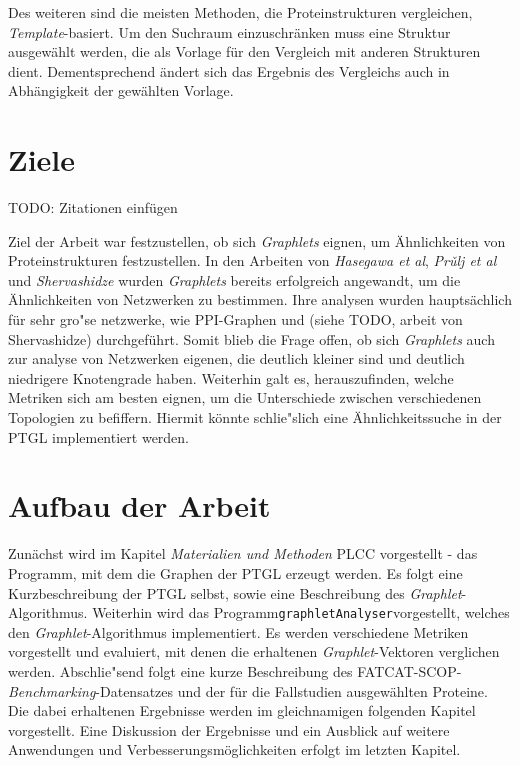 \documentclass{report}
\begin{document}
Des weiteren sind die meisten Methoden, die Proteinstrukturen vergleichen, \textit{Template}-basiert. Um den Suchraum einzuschr\"anken muss eine Struktur ausgew\"ahlt werden, die als Vorlage f\"ur den Vergleich mit anderen Strukturen dient. Dementsprechend \"andert sich das Ergebnis des Vergleichs auch in Abh\"angigkeit der gew\"ahlten Vorlage.



\section{Ziele}

TODO: Zitationen einf\"ugen

Ziel der Arbeit war festzustellen, ob sich \textit{Graphlets} eignen, um \"Ahnlichkeiten von Proteinstrukturen festzustellen. In den Arbeiten von \emph{Hasegawa et al}, \emph{Pr\v{u}lj et al} und \emph{Shervashidze} wurden \textit{Graphlets} bereits erfolgreich angewandt, um die \"Ahnlichkeiten von Netzwerken zu bestimmen. Ihre analysen wurden haupts\"achlich f\"ur sehr gro"se netzwerke, wie PPI-Graphen und (siehe TODO, arbeit von Shervashidze) durchgef\"uhrt. Somit blieb die Frage offen, ob sich \textit{Graphlets} auch zur analyse von Netzwerken eigenen, die deutlich kleiner sind und deutlich niedrigere Knotengrade haben.
Weiterhin galt es, herauszufinden, welche Metriken sich am besten eignen, um die Unterschiede zwischen verschiedenen Topologien zu befiffern.
Hiermit k\"onnte schlie"slich eine \"Ahnlichkeitssuche in der PTGL implementiert werden.

\section{Aufbau der Arbeit}

Zun\"achst wird im Kapitel \emph{Materialien und Methoden} PLCC vorgestellt - das Programm, mit dem die Graphen der PTGL erzeugt werden. Es folgt eine Kurzbeschreibung der PTGL selbst, sowie eine Beschreibung des \textit{Graphlet}-Algorithmus. Weiterhin wird das Programm\texttt{graphletAnalyser}vorgestellt, welches den \textit{Graphlet}-Algorithmus implementiert. Es werden verschiedene Metriken vorgestellt und evaluiert, mit denen die erhaltenen \textit{Graphlet}-Vektoren verglichen werden.
Abschlie"send folgt eine kurze Beschreibung des FATCAT-SCOP-\textit{Benchmarking}-Datensatzes und der f\"ur die Fallstudien ausgew\"ahlten Proteine.
Die dabei erhaltenen Ergebnisse werden im gleichnamigen folgenden Kapitel vorgestellt. Eine Diskussion der Ergebnisse und ein Ausblick auf weitere Anwendungen und Verbesserungsm\"oglichkeiten erfolgt im letzten Kapitel.
\end{document}
